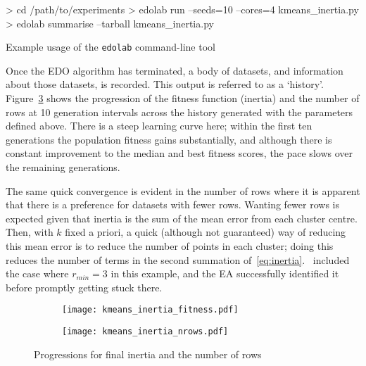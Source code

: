 \begin{listing}
\begin{usagesh}
> cd /path/to/experiments
> edolab run --seeds=10 --cores=4 kmeans_inertia.py
> edolab summarise --tarball kmeans_inertia.py
\end{usagesh}
\caption{Example usage of the \texttt{edolab} command-line tool}
\label{snp:edolab}
\end{listing}

Once the EDO algorithm has terminated, a body of datasets, and information about
those datasets, is recorded. This output is referred to as a `history'.
Figure~\ref{fig:inertia_progression} shows the progression of the fitness
function (inertia) and the number of rows at 10 generation intervals across the
history generated with the parameters defined above. There is a steep learning
curve here; within the first ten generations the population fitness gains
substantially, and although there is constant improvement to the median and best
fitness scores, the pace slows over the remaining generations.

The same quick convergence is evident in the number of rows where it is apparent
that there is a preference for datasets with fewer rows. Wanting fewer rows is
expected given that inertia is the sum of the mean error from each cluster
centre. Then, with \(k\) fixed a priori, a quick (although not guaranteed) way
of reducing this mean error is to reduce the number of points in each cluster;
doing this reduces the number of terms in the second summation
of~\eqref{eq:inertia}.~\cite{Wilde2020:edo} included the case where
\(r_{min}=3\) in this example, and the EA successfully identified it before
promptly getting stuck there.

\begin{figure}[htbp]
    \centering
    \begin{subfigure}{\imgwidth}
        \texttt{[image: kmeans\_inertia\_fitness.pdf]}
        \label{fig:kmeans_inertia_fitness}
    \end{subfigure}

    \begin{subfigure}{\imgwidth}
        \texttt{[image: kmeans\_inertia\_nrows.pdf]}
        \label{fig:kmeans_inertia_nrows}
    \end{subfigure}
    \caption{%
        Progressions for final inertia and the number of rows
    }\label{fig:inertia_progression}
\end{figure}

